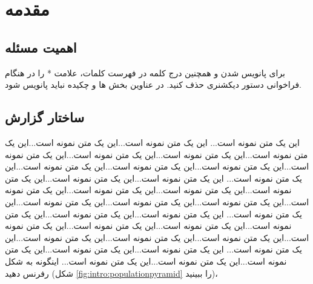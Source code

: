 \chapter{مقدمه}

\section{اهمیت مسئله}
برای پانویس شدن و همچنین درج کلمه در فهرست کلمات، علامت * را در هنگام فراخوانی دستور دیکشنری حذف کنید. در عناوین بخش ها و چکیده نباید پانویس شود.

  
\section{ساختار گزارش}

این یک متن نمونه است... این یک متن نمونه است...این یک متن نمونه است...این یک متن نمونه است...این یک متن نمونه است...این یک متن نمونه است...این یک متن نمونه است...این یک متن نمونه است...این یک متن نمونه است...این یک متن نمونه است...این یک متن نمونه است... این یک متن نمونه است...این یک متن نمونه است...این یک متن نمونه است...این یک متن نمونه است...این یک متن نمونه است...این یک متن نمونه است...این یک متن نمونه است...این یک متن نمونه است...این یک متن نمونه است...این یک متن نمونه است... این یک متن نمونه است...این یک متن نمونه است...این یک متن نمونه است...این یک متن نمونه است...این یک متن نمونه است...این یک متن نمونه است...این یک متن نمونه است...این یک متن نمونه است...این یک متن نمونه است...این یک متن نمونه است... این یک متن نمونه است...این یک متن نمونه است...این یک متن نمونه است...این یک متن نمونه است...این یک متن نمونه است...
اینگونه به شکل رفرنس دهید (شکل \ref{fig:intro:populationpyramid} را ببینید)، 

